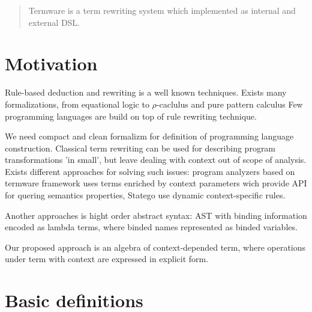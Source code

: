 \documentclass[12pt]{article}
\begin{document}
\maketitle

\begin{abstract}
 Termware is a term rewriting system which implemented as internal and external DSL.
\end{abstract}

\section{Motivation}

  Rule-based deduction and rewriting is a well known techniques. Exists many formalizations, from
  equational logic to $\rho$-caclulus \cite{RhoCal-Wrla2002} and pure pattern calculus\cite{Jay05purepattern}   Few programming languages are build on top of rule rewriting technique.

  We need compact and clean formalizm for definition of programming language construction. Classical term
 rewriting can be used for describing program transformations 'in small', but leave dealing with context out 
 of scope of analysis. Exists different approaches for solving such issues: program analyzers based on 
 termware framework \cite{DBLP:journals/fuin/DoroshenkoS06} uses terms enriched by context parameters wich provide
 API for quering semantics properties, Statego\cite{BravenboerKVV08} use dynamic context-specific rules.

 Another approaches is hight order abstract syntax\cite{Pfenning:1988:HAS:53990.54010}: AST with binding information encoded as lambda terms, where binded names represented as binded variables.  

 Our proposed approach is an algebra of context-depended term, where operations under term with context are expressed in explicit form.

\section{Basic definitions}
\end{document}
